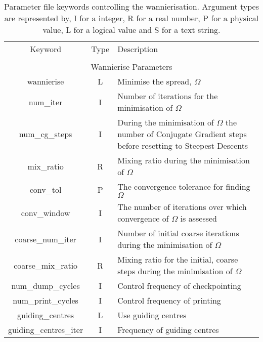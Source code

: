 \begin{table}
\begin{center}
\begin{tabular}{|c|c|p{6cm}|}
\hline
Keyword & Type & Description \\
        &      &             \\
\hline\hline
\multicolumn{3}{|c|}{Wannierise Parameters} \\
\hline
{\sc wannierise }   & L &  Minimise the spread, $\Omega$ \\
{\sc num\_iter }   & I & Number of iterations for the minimisation
of $\Omega$ \\
{\sc num\_cg\_steps }   & I & During the minimisation
of $\Omega$ the number of Conjugate Gradient steps before resetting to
Steepest Descents \\
{\sc mix\_ratio }   & R &Mixing ratio during the minimisation of $\Omega$  \\
{\sc conv\_tol }   & P &The convergence tolerance for finding $\Omega$  \\
{\sc conv\_window }   & I & The number of iterations over which
convergence of $\Omega$ is assessed \\
{\sc coarse\_num\_iter }   & I & Number of initial coarse iterations
during the minimisation
of $\Omega$ \\
{\sc coarse\_mix\_ratio }   & R & Mixing ratio for the initial, coarse
steps during the minimisation of $\Omega$ \\
{\sc num\_dump\_cycles }   & I & Control frequency of checkpointing \\
{\sc num\_print\_cycles }   & I & Control frequency of printing \\
{\sc guiding\_centres }   & L & Use guiding centres \\
{\sc guiding\_centres\_iter }   & I & Frequency of guiding centres \\
\hline
\end{tabular}
\caption[Parameter file keywords controlling the Wannierise routine.]
{Parameter file keywords controlling the wannierisation.  Argument types
are represented by, I for a integer, R for a real number, P for a
physical value, L for a logical value and S for a text string.}
\label{parameter_keywords5}
\end{center}
\end{table}



